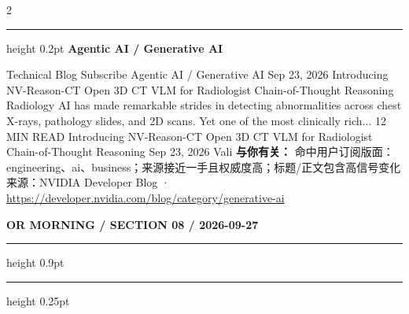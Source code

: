 \documentclass[10.5pt]{ctexart}
\begin{document}
\begin{multicols}{2}
\vspace{2mm}
\hrule height 0.2pt
\vspace{2mm}
{\large\bfseries Agentic AI / Generative AI}\par
Technical Blog Subscribe Agentic AI / Generative AI Sep 23, 2026 Introducing NV-Reason-CT Open 3D CT VLM for Radiologist Chain-of-Thought Reasoning Radiology AI has made remarkable strides in detecting abnormalities across chest X-rays, pathology slides, and 2D scans. Yet one of the most clinically rich... 12 MIN READ Introducing NV-Reason-CT Open 3D CT VLM for Radiologist Chain-of-Thought Reasoning Sep 23, 2026 Vali
\textbf{与你有关：} 命中用户订阅版面：engineering、ai、business；来源接近一手且权威度高；标题/正文包含高信号变化
{\footnotesize\color{ormuted} 来源：NVIDIA Developer Blog · \url{https://developer.nvidia.com/blog/category/generative-ai}}
\end{multicols}
\newpage
{\small\bfseries OR MORNING / SECTION 08 / 2026-09-27}
\vspace{2mm}
\hrule height 0.9pt
\vspace{1.5mm}
\hrule height 0.25pt
\vspace{4mm}
\end{document}
